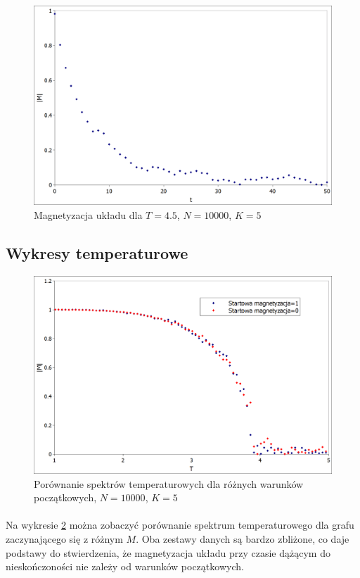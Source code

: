 \documentclass[12pt,a4paper]{article}
\begin{document}
\begin{figure}[H]
\includegraphics[width=\textwidth]{czas_T4_5.png}
\caption{Magnetyzacja układu dla $T=4.5$, $N=10000$, $K=5$}
\label{fig:czas_T4_5}
\end{figure}

\subsection{Wykresy temperaturowe}

\begin{figure}[H]
\includegraphics[width=\textwidth]{rozne_warunki_poczatkowe.png}
\caption{Porównanie spektrów temperaturowych dla różnych warunków początkowych, $N=10000$, $K=5$}
\label{fig:rozne_warunki}
\end{figure}

\paragraph{}
Na wykresie \ref{fig:rozne_warunki} można zobaczyć porównanie spektrum temperaturowego dla grafu zaczynającego się z różnym $M$. Oba zestawy danych są bardzo zbliżone, co daje podstawy do stwierdzenia, że magnetyzacja układu przy czasie dążącym do nieskończoności nie zależy od warunków początkowych. 
\end{document}
